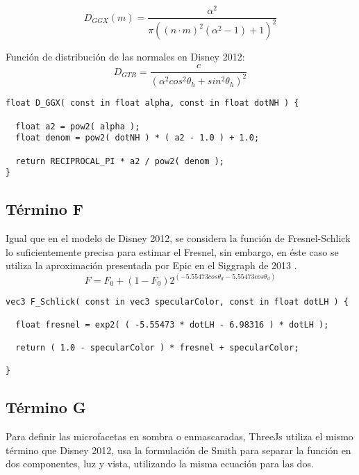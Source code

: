  \begin{equation}
    D_{GGX}(m) = \frac{\alpha^2}{\pi((n\cdotp{m})^2(\alpha^2 - 1 ) + 1)^2}
  \end{equation}
  \singlespacing

  Funci\'on de distribuci\'on de las normales en Disney 2012:\\

  \begin{equation}
    D_{GTR} = \frac
    {c}
    {(\alpha^2 cos^2 \theta_h + sin^2 \theta_h)^2}
  \end{equation}
  \singlespacing

  \begin{lstlisting}[caption=Implementaci\'on en ThreeJs del t\'ermino de geometr\'ia]
float D_GGX( const in float alpha, const in float dotNH ) {

  float a2 = pow2( alpha );
  float denom = pow2( dotNH ) * ( a2 - 1.0 ) + 1.0;

  return RECIPROCAL_PI * a2 / pow2( denom );
}
  \end{lstlisting}
  \singlespacing

  \subsection*{T\'ermino F}
  Igual que en el modelo de Disney 2012, se considera la funci\'on de Fresnel-Schlick lo suficientemente precisa para
  estimar el Fresnel, sin embargo, en \'este caso se utiliza la aproximaci\'on presentada por Epic en el Siggraph de 2013 \autocite{unreal}.\\

  \begin{equation}
    F= F_0 + (1 - F_0)2^{(-5.55473cos\theta_d - 5.55473cos\theta_d)}
  \end{equation}

  \begin{lstlisting}[caption=Implementaci\'on en ThreeJs de la aproximaci\'on a la funci\'on de Fresnel]
vec3 F_Schlick( const in vec3 specularColor, const in float dotLH ) {

  float fresnel = exp2( ( -5.55473 * dotLH - 6.98316 ) * dotLH );

  return ( 1.0 - specularColor ) * fresnel + specularColor;

}
  \end{lstlisting}

  \subsection*{T\'ermino G}
  Para definir las microfacetas en sombra o enmascaradas, ThreeJs utiliza el mismo t\'ermino que Disney 2012, usa
  la formulaci\'on de Smith para separar la funci\'on en dos componentes, luz y vista, utilizando la misma ecuaci\'on
  para las dos.\\

